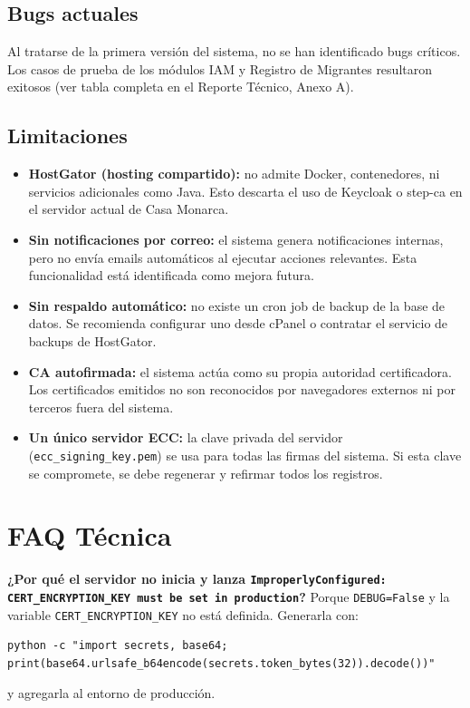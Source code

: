 \documentclass[10pt,letterpaper]{report}
\begin{document}
\section{Bugs actuales}

Al tratarse de la primera versión del sistema, no se han identificado bugs críticos. Los casos de prueba de los módulos IAM y Registro de Migrantes resultaron exitosos (ver tabla completa en el Reporte Técnico, Anexo A).

\section{Limitaciones}

\begin{itemize}[leftmargin=*]
    \item \textbf{HostGator (hosting compartido):} no admite Docker, contenedores, ni servicios adicionales como Java. Esto descarta el uso de Keycloak o step-ca en el servidor actual de Casa Monarca.
    \item \textbf{Sin notificaciones por correo:} el sistema genera notificaciones internas, pero no envía emails automáticos al ejecutar acciones relevantes. Esta funcionalidad está identificada como mejora futura.
    \item \textbf{Sin respaldo automático:} no existe un cron job de backup de la base de datos. Se recomienda configurar uno desde cPanel o contratar el servicio de backups de HostGator.
    \item \textbf{CA autofirmada:} el sistema actúa como su propia autoridad certificadora. Los certificados emitidos no son reconocidos por navegadores externos ni por terceros fuera del sistema.
    \item \textbf{Un único servidor ECC:} la clave privada del servidor (\texttt{ecc\_signing\_key.pem}) se usa para todas las firmas del sistema. Si esta clave se compromete, se debe regenerar y refirmar todos los registros.
\end{itemize}

\chapter{FAQ Técnica}

\textbf{¿Por qué el servidor no inicia y lanza \texttt{ImproperlyConfigured: CERT\_ENCRYPTION\_KEY must be set in production}?}
Porque \texttt{DEBUG=False} y la variable \texttt{CERT\_ENCRYPTION\_KEY} no está definida. Generarla con:
\begin{lstlisting}
python -c "import secrets, base64; print(base64.urlsafe_b64encode(secrets.token_bytes(32)).decode())"
\end{lstlisting}
y agregarla al entorno de producción.
\end{document}
